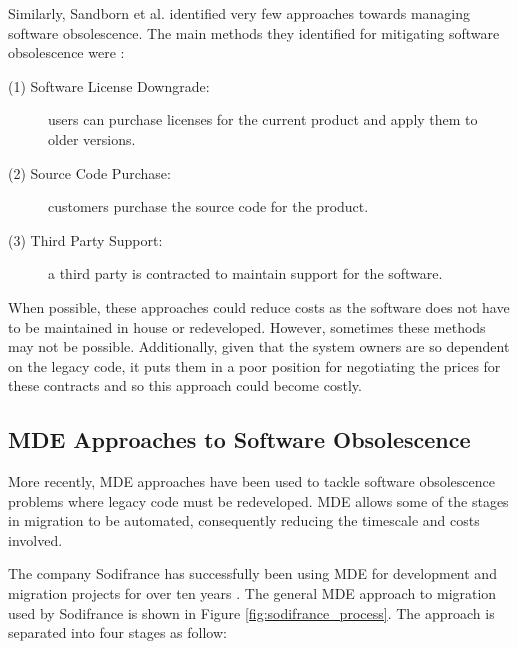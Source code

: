 \documentclass{UoYCSproject}
\begin{document}
Similarly, Sandborn et al. identified very few approaches towards managing software obsolescence. The main methods they identified for mitigating software obsolescence were \parencite{sandborn2007obsolescence}:
\begin{description}
\item[(1) Software License Downgrade:] users can purchase licenses for the current product and apply them to older versions.
\item[(2) Source Code Purchase:] customers purchase the source code for the product.
\item[(3) Third Party Support:] a third party is contracted to maintain support for the software.
\end{description}
When possible, these approaches could reduce costs as the software does not have to be maintained in house or redeveloped. However, sometimes these methods may not be possible. Additionally, given that the system owners are so dependent on the legacy code, it puts them in a poor position for negotiating the prices for these contracts and so this approach could become costly.

\subsection{MDE Approaches to Software Obsolescence} \label{mde_approaches}
More recently, MDE approaches have been used to tackle software obsolescence problems where legacy code must be redeveloped. MDE allows some of the stages in migration to be automated, consequently reducing the timescale and costs involved.

The company Sodifrance has successfully been using MDE for development and migration projects for over ten years \parencite{fleurey2007model}. The general MDE approach to migration used by Sodifrance is shown in Figure \ref{fig:sodifrance_process}. The approach is separated into four stages as follow:
\end{document}
